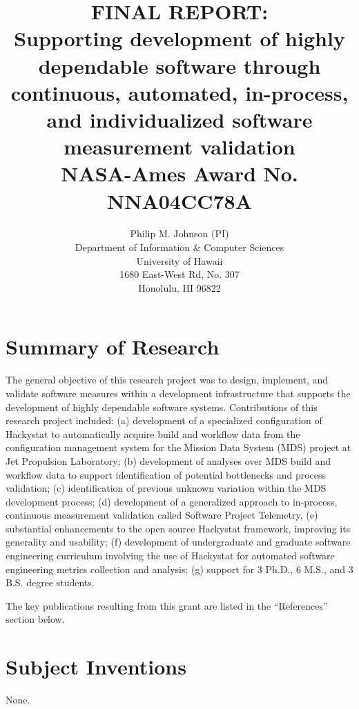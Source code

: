 \documentclass[11pt]{article}
\begin{document}
\title{
FINAL REPORT: \\ \protect \medskip
Supporting development of highly dependable software through
continuous, automated, in-process, and individualized software measurement validation \\ \protect \medskip
NASA-Ames Award No. NNA04CC78A
}

\medskip

\author{
Philip M. Johnson (PI)\\ 
Department of Information \& Computer Sciences\\
University of Hawaii\\
1680 East-West Rd, No. 307\\
Honolulu, HI 96822
\protect \medskip
}

\maketitle

\pagestyle{plain}

\section{Summary of Research}

The general objective of this  research project was to design,
implement, and validate software measures within a development
infrastructure that supports the development of highly dependable software
systems.  Contributions of this research project included: (a) development
of a specialized configuration of Hackystat to automatically acquire build
and workflow data from the configuration management system for the Mission
Data System (MDS) project at Jet Propulsion Laboratory; (b) development of
analyses over MDS build and workflow data to support identification of
potential bottlenecks and process validation; (c) identification of
previous unknown variation within the MDS development process; (d)
development of a generalized approach to in-process, continuous measurement
validation called Software Project Telemetry, (e) substantial enhancements
to the open source Hackystat framework, improving its generality and
usability; (f) development of undergraduate and graduate software
engineering curriculum involving the use of Hackystat for automated
software engineering metrics collection and analysis; (g) support for 3
Ph.D., 6 M.S., and 3 B.S. degree students.

The key publications resulting from this grant are listed in the ``References'' section below.

\nocite{*}

\section{Subject Inventions}

None.



\end{document}

